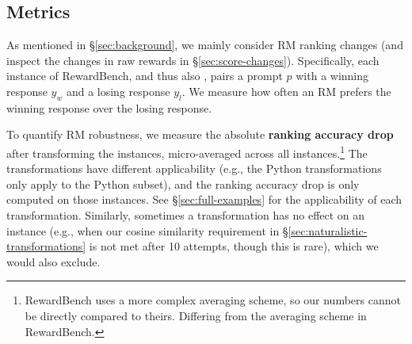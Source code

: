 \subsection{Metrics} \label{sec:metrics}

As mentioned in \S\ref{sec:background}, we mainly consider RM ranking changes (and inspect the changes in raw rewards in \S\ref{sec:score-changes}). Specifically, each instance of RewardBench, and thus also \benchmark, pairs a prompt $p$ with a winning response $y_w$ and a losing response $y_l$. We measure how often an RM prefers the winning response over the losing response. %

To quantify RM robustness, we measure the absolute \textbf{ranking accuracy drop} after transforming the instances, micro-averaged across all instances.\footnote{
\iflongversion
RewardBench uses a more complex averaging scheme, so our numbers cannot be directly compared to theirs.
\else
Differing from the averaging scheme in RewardBench.
\fi} The transformations have different applicability (e.g., the Python transformations only apply to the Python subset), and the ranking accuracy drop is only computed on those instances.
See \S\ref{sec:full-examples} for the applicability of each transformation.
Similarly, sometimes a transformation has no effect on an instance (e.g., when our cosine similarity requirement in \S\ref{sec:naturalistic-transformations} is not met after 10 attempts, though this is rare), which we would also exclude.
